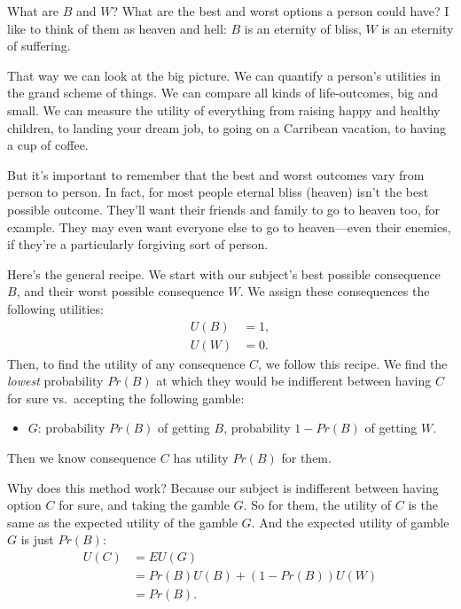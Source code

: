 \documentclass[justified]{tufte-book}
\providecommand{\tightlist}{%
  \setlength{\itemsep}{0pt}\setlength{\parskip}{0pt}}
\renewcommand{\u}{U}
\newcommand{\p}{Pr}
\newcommand{\EU}{EU}
\theoremstyle{definition}
\theoremstyle{definition}
\theoremstyle{definition}
\theoremstyle{remark}
\begin{document}
\begin{marginfigure}
What are \(B\) and \(W\)? What are the best and worst options a person
could have? I like to think of them as heaven and hell: \(B\) is an
eternity of bliss, \(W\) is an eternity of suffering.

That way we can look at the big picture. We can quantify a person's
utilities in the grand scheme of things. We can compare all kinds of
life-outcomes, big and small. We can measure the utility of everything
from raising happy and healthy children, to landing your dream job, to
going on a Carribean vacation, to having a cup of coffee.

But it's important to remember that the best and worst outcomes vary
from person to person. In fact, for most people eternal bliss (heaven)
isn't the best possible outcome. They'll want their friends and family
to go to heaven too, for example. They may even want everyone else to go
to heaven---even their enemies, if they're a particularly forgiving sort
of person.
\end{marginfigure}

Here's the general recipe. We start with our subject's best possible consequence \(B\), and their worst possible consequence \(W\). We assign these consequences the following utilities:
\[
  \begin{aligned}
    \u(B) &= 1,\\
    \u(W) &= 0.
  \end{aligned}
\]
Then, to find the utility of any consequence \(C\), we follow this recipe. We find the \emph{lowest} probability \(\p(B)\) at which they would be indifferent between having \(C\) for sure vs.~accepting the following gamble:

\begin{itemize}
\tightlist
\item
  \(G\): probability \(\p(B)\) of getting \(B\), probability \(1-\p(B)\) of getting \(W\).
\end{itemize}

Then we know consequence \(C\) has utility \(\p(B)\) for them.

Why does this method work? Because our subject is indifferent between having option \(C\) for sure, and taking the gamble \(G\). So for them, the utility of \(C\) is the same as the expected utility of the gamble \(G\). And the expected utility of gamble \(G\) is just \(\p(B)\):
\[
  \begin{aligned}
    \u(C) &= \EU(G)\\
          &= \p(B) \u(B) + (1-\p(B)) \u(W)\\
          &= \p(B).
  \end{aligned}
\]
\end{document}
